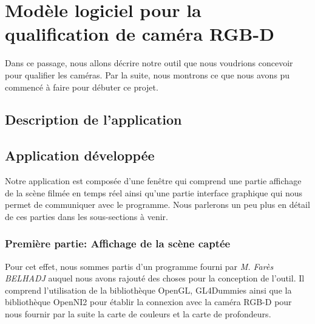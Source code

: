 \documentclass[a4paper, 12pt]{book}
\newcounter{program}[subsection]
\begin{document}
\chapter[Modèle logiciel pour la qualification]{Modèle logiciel pour la qualification de caméra RGB-D}
Dans ce passage, nous allons décrire notre outil que nous voudrions concevoir pour qualifier les caméras. Par la suite, nous montrons ce que nous avons pu commencé à faire pour débuter ce projet.


\section{Description de l'application}


\section{Application développée}
Notre application est composée d'une fenêtre qui comprend une partie affichage de la scène filmée en temps réel ainsi qu'une partie interface graphique qui nous permet de communiquer avec le programme. Nous parlerons un peu plus en détail de ces parties dans les sous-sections à venir.
\subsection{Première partie: Affichage de la scène captée }
Pour cet effet, nous sommes partis d'un programme fourni par \emph{M. Farès BELHADJ} auquel nous avons rajouté des choses pour la conception de l'outil. Il comprend l'utilisation de la bibliothèque OpenGL, GL4Dummies ainsi que la bibliothèque OpenNI2 pour établir la connexion avec la caméra RGB-D pour nous fournir par la suite la carte de couleurs et la carte de profondeurs.
\end{document}
